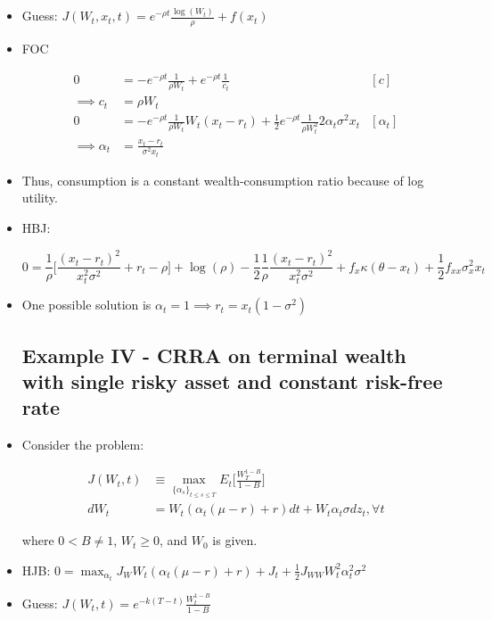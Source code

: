 \documentclass{article}
\begin{document}
\begin{itemize}
\item Guess: $J(W_t, x_t, t) = e^{-\rho t} \frac{\log(W_t)}{\rho} + f(x_t)$

\item FOC

\begin{align*}
0 &= - e^{-\rho t} \frac{1}{\rho W_t} + e^{-\rho t} \frac{1}{c_t} & [c]\\
\implies
c_t &= \rho W_t \\
0 &= - e^{-\rho t} \frac{1}{\rho W_t} W_t(x_t - r_t) + \frac{1}{2} e^{-\rho t} \frac{1}{\rho W_t^2} 2 \alpha_t \sigma^2 x_t & [\alpha_t]\\
\implies
\alpha_t &= \frac{x_t - r_t}{\sigma^2 x_t}
\end{align*}

\item Thus, consumption is a constant wealth-consumption ratio because of log utility.

\item HBJ:

$$
0 = \frac{1}{\rho} \Bigg[  \frac{(x_t - r_t)^2}{x_t^2 \sigma^2} + r_t  - \rho \Bigg] + \log(\rho) - \frac{1}{2} \frac{1}{\rho} \frac{(x_t - r_t)^2}{x_t^2 \sigma^2} + f_x \kappa (\theta - x_t) + \frac{1}{2} f_{xx} \sigma_x^2 x_t
$$

\item One possible solution is $\alpha_t = 1 \implies r_t = x_t (1 - \sigma^2)$

\subsection*{Example IV - CRRA on terminal wealth with single risky asset and constant risk-free rate}

\item Consider the problem:

\begin{align*}
J(W_t, t) &\equiv \max_{\{\alpha_s\}_{t \le s \le T}} E_t \Bigg[ \frac{W_T^{1-B}}{1-B} \Bigg] \\
dW_t &= W_t (\alpha_t (\mu - r) + r) dt + W_t \alpha_t \sigma dz_t, \forall t
\end{align*}

where $0 < B \neq 1$, $W_t \ge 0$, and $W_0$ is given.

\item HJB: $0 = \max_{\alpha_t} J_W W_t (\alpha_t (\mu -r) + r) + J_t + \frac{1}{2} J_{WW} W_t^2 \alpha_t^2 \sigma^2$

\item Guess: $J(W_t, t) = e^{-k(T-t)} \frac{W_t^{1-B}}{1-B}$


\end{itemize}
\end{document}
